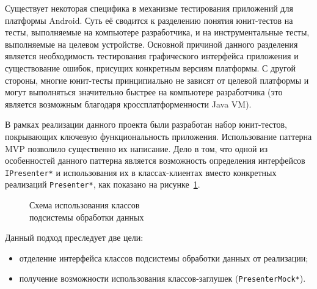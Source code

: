 Существует некоторая специфика в механизме тестирования приложений
для платформы Android. Суть её сводится к разделению понятия юнит-тестов
на тесты, выполняемые на компьютере разработчика, и на инструментальные тесты,
выполняемые на целевом устройстве.
Основной причиной данного разделения является необходимость тестирования
графического интерфейса приложения и существование ошибок,
присущих конкретным версиям платформы.
С другой стороны, многие юнит-тесты принципиально не зависят от
целевой платформы и могут выполняться значительно быстрее
на компьютере разработчика
(это является возможным благодаря кроссплатформенности Java VM).

В рамках реализации данного проекта были разработан набор юнит-тестов,
покрывающих ключевую функциональность приложения.
Использование паттерна MVP позволило существенно их написание.
Дело в том, что одной из особенностей данного паттерна является возможность
определения интерфейсов \texttt{IPresenter*} и использования
их в классах-клиентах вместо конкретных реализаций \texttt{Presenter*},
как показано на рисунке~\ref{fig:implementation_testing_presenter}.

\begin{figure}[h!]
  \centering
  \caption{Схема использования классов \\ подсистемы обработки данных}
  \label{fig:implementation_testing_presenter}
\end{figure}

Данный подход преследует две цели:
\begin{itemize}
\item отделение интерфейса классов подсистемы обработки данных от реализации;
\item получение возможности использования классов-заглушек (\texttt{PresenterMock*}).
\end{itemize}

